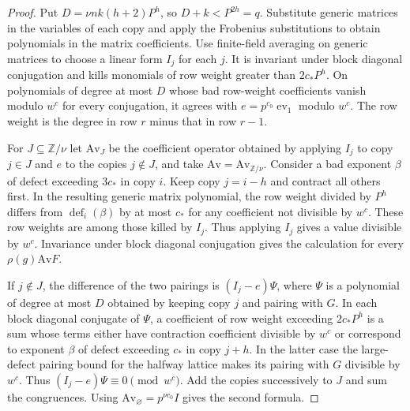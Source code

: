 \begin{proof}
Put $D=\nu nk(h+2)P^h$, so $D+k<P^{2h}=q$. Substitute generic matrices in the variables of each copy and apply the Frobenius substitutions to obtain polynomials in the matrix coefficients. Use finite-field averaging on generic matrices to choose a linear form $I_j$ for each $j$. It is invariant under block diagonal conjugation and kills monomials of row weight greater than $2c_\ast P^h$. On polynomials of degree at most $D$ whose bad row-weight coefficients vanish modulo $w^c$ for every conjugation, it agrees with $e=p^{c_0}\operatorname{ev}_{1}$ modulo $w^c$. The row weight is the degree in row $r$ minus that in row $r-1$.

For $J\subseteq\mathbb Z/\nu$ let $\mathrm{Av}_J$ be the coefficient operator obtained by applying $I_j$ to copy $j\in J$ and $e$ to the copies $j\notin J$, and take $\mathrm{Av}=\mathrm{Av}_{\mathbb Z/\nu}$. Consider a bad exponent $\beta$ of defect exceeding $3c_\ast$ in copy $i$. Keep copy $j=i-h$ and contract all others first. In the resulting generic matrix polynomial, the row weight divided by $P^h$ differs from $\operatorname{def}_i(\beta)$ by at most $c_\ast$ for any coefficient not divisible by $w^c$. These row weights are among those killed by $I_j$. Thus applying $I_j$ gives a value divisible by $w^c$. Invariance under block diagonal conjugation gives the calculation for every $\rho(g)\mathrm{Av}F$.

If $j\notin J$, the difference of the two pairings is $(I_j-e)\Psi$, where $\Psi$ is a polynomial of degree at most $D$ obtained by keeping copy $j$ and pairing with $G$. In each block diagonal conjugate of $\Psi$, a coefficient of row weight exceeding $2c_\ast P^h$ is a sum whose terms either have contraction coefficient divisible by $w^c$ or correspond to exponent $\beta$ of defect exceeding $c_\ast$ in copy $j+h$. In the latter case the large-defect pairing bound for the halfway lattice makes its pairing with $G$ divisible by $w^c$. Thus $(I_j-e)\Psi\equiv0\pmod{w^c}$. Add the copies successively to $J$ and sum the congruences. Using $\mathrm{Av}_{\varnothing}=p^{\nu c_0}I$ gives the second formula.
\end{proof}

